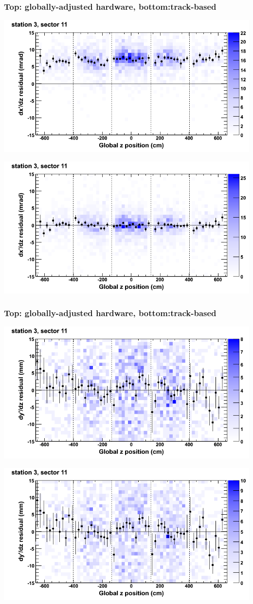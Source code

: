 \documentclass[compress]{beamer}
\begin{document}
\begin{frame}
\frametitle{Top: globally-adjusted hardware, bottom:track-based}
\includegraphics[width=0.7\linewidth]{NOV4_mapplots_HW/DTvsz_st3sec11_dxdz.png}

\includegraphics[width=0.7\linewidth]{NOV4_mapplots/DTvsz_st3sec11_dxdz.png}
\end{frame}

\begin{frame}
\frametitle{Top: globally-adjusted hardware, bottom:track-based}
\includegraphics[width=0.7\linewidth]{NOV4_mapplots_HW/DTvsz_st3sec11_dydz.png}

\includegraphics[width=0.7\linewidth]{NOV4_mapplots/DTvsz_st3sec11_dydz.png}
\end{frame}
\end{document}
